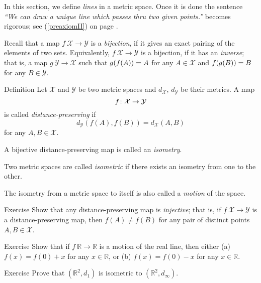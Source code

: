 In this section, we define {}\emph{lines} in a metric space.
Once it is done the sentence {}\emph{``We can draw a unique line which passes thru two given points.''} becomes rigorous; see (\ref{preaxiomII}) on page \pageref{preaxiomII}. 

Recall that a map $f\:\mathcal{X}\to\mathcal{Y}$
is a \emph{bijection},
if it gives an exact pairing of the elements of two sets.
Equivalently, $f\:\mathcal{X}\to\mathcal{Y}$ is a bijection, if it has an \emph{inverse};
that is, a map $g\:\mathcal{Y}\to\mathcal{X}$
such that 
$g(f(A))\z=A$ for any $A\in\mathcal{X}$
and
$f(g(B))\z=B$ for any $B\in\mathcal{Y}$. 

\begin{thm}{Definition}\label{def:isom}
Let $\mathcal X$ and $\mathcal Y$ be two metric spaces and $d_{\mathcal X}$, $d_{\mathcal Y}$ be their metrics. 
A map 
$$f\:\mathcal X \z\to \mathcal Y$$ 
is
called \emph{distance-preserving} if 
$$d_{\mathcal Y}(f(A), f(B))
 = d_{\mathcal X}(A,B)$$
for any $A,B\in {\mathcal X}$.

A bijective distance-preserving map is called an \emph{isometry}. 

Two metric spaces are called
\emph{isometric} if there exists an isometry from one to the other.

The isometry from a metric space to itself 
is also called a \emph{motion} of the space.
\end{thm}

\begin{thm}{Exercise}\label{ex:dist-preserv=>injective}
Show that any distance-preserving map is \emph{injective};
that is, if $f\:\mathcal X\to\mathcal Y$ is a distance-preserving map, 
then $f(A)\ne f(B)$ for any pair of distinct points $A, B\in \mathcal X$.
\end{thm}

\begin{thm}{Exercise}\label{ex:motion-of-R}
Show that if $f\:\mathbb{R}\to\mathbb{R}$ is a motion of the real line,
then either (a)
$f(x)=f(0)+x$ for any $x\in \mathbb{R}$, 
or (b)
$f(x)=f(0)-x$ for any $x\in \mathbb{R}$. 

\end{thm}

\begin{thm}{Exercise}\label{ex:d_1=d_infty}
Prove that $(\mathbb{R}^2,d_1)$ is isometric to $(\mathbb{R}^2,d_\infty)$.
\end{thm}

